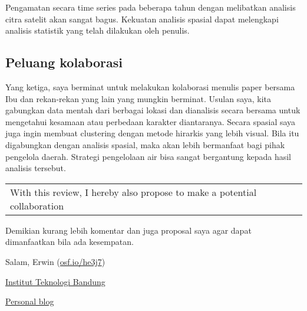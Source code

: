 \documentclass[10pt]{article}
\let\cite\citep
\renewenvironment{quote}
  {\begin{tabular}{|p{13cm}}}
  {\end{tabular}}
\providecommand\citep{\cite}
\begin{document}
\par\null

Pengamatan secara time series pada beberapa tahun dengan melibatkan
analisis citra satelit \cite{oktavia2017,k2017} akan sangat bagus. Kekuatan
analisis spasial dapat melengkapi analisis statistik yang telah
dilakukan oleh penulis.

\par\null

\subsection*{Peluang kolaborasi}

{\label{473265}}

Yang ketiga, saya berminat untuk melakukan kolaborasi menulis paper
bersama Ibu dan rekan-rekan yang lain yang mungkin berminat. Usulan
saya, kita gabungkan data mentah dari berbagai lokasi dan dianalisis
secara bersama untuk mengetahui kesamaan atau perbedaan karakter
diantaranya. Secara spasial saya juga ingin membuat clustering dengan
metode hirarkis yang lebih visual. Bila itu digabungkan dengan analisis
spasial, maka akan lebih bermanfaat bagi pihak pengelola daerah.
Strategi pengelolaan air bisa sangat bergantung kepada hasil analisis
tersebut.~

\par\null

\begin{quote}
With this review, I hereby also propose to make a potential
collaboration~
\end{quote}

\par\null

Demikian kurang lebih komentar dan juga proposal saya agar dapat
dimanfaatkan bila ada kesempatan.

\par\null

Salam, Erwin (\href{http://osf.io/he3j7}{osf.io/he3j7})

\href{http://www.itb.ac.id}{Institut Teknologi Bandung}

\href{http://dasaptaerwin.net}{Personal blog}

\FloatBarrier


\end{document}
